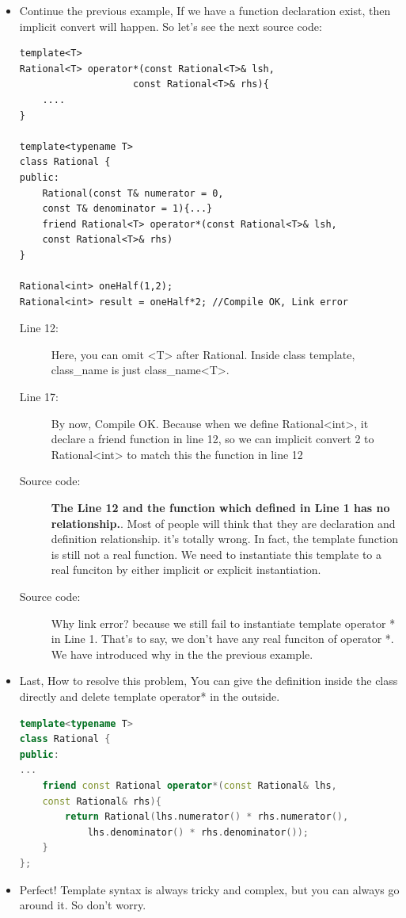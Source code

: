 \documentclass[a4paper,11pt,twoside]{book}
\begin{document}
\begin{itemize}
	\item Continue the previous example, If we have a function declaration exist, then implicit convert will happen. So let's see the next source code:
\begin{lstlisting}
template<T>
Rational<T> operator*(const Rational<T>& lsh, 
					const Rational<T>& rhs){
	....
}

template<typename T>
class Rational {
public:
	Rational(const T& numerator = 0,
	const T& denominator = 1){...}
	friend Rational<T> operator*(const Rational<T>& lsh, 
	const Rational<T>& rhs)
} 

Rational<int> oneHalf(1,2);
Rational<int> result = oneHalf*2; //Compile OK, Link error
\end{lstlisting}
\begin{description}
	\item[Line 12:] Here, you can omit <T> after Rational. Inside class template, class\_name is just class\_name<T>.
	
	\item[Line 17:] By now, Compile OK. Because when we define Rational<int>, it declare a friend function in line 12, so we can implicit convert 2 to Rational<int> to match this the function in line 12
	
	\item[Source code:] \textbf{The Line 12 and the function which defined in Line 1 has no relationship.}. Most of people will think that they are declaration and definition relationship. it's totally wrong. In fact, the template function is still not a real function.  We need to instantiate this template to a real funciton by either implicit or explicit instantiation.
	
	\item[Source code:] Why link error? because we still fail to instantiate template operator * in Line 1. That's to say, we don't have any real funciton of operator *. We have introduced why in the the previous example.
\end{description}

	\item Last, How to resolve this problem, You can give the definition inside the class directly and delete template operator* in the outside. 
\begin{lstlisting}[frame=single, language=c++]
template<typename T>
class Rational {
public:
...
	friend const Rational operator*(const Rational& lhs, 
	const Rational& rhs){
		return Rational(lhs.numerator() * rhs.numerator(), 
			lhs.denominator() * rhs.denominator());  
	} 
};
\end{lstlisting}

	\item Perfect! Template syntax is always tricky and complex, but you can always go around it. So don't worry.

\end{itemize}
\end{document}
